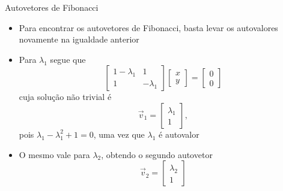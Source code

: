 \begin{frame}[fragile]{Autovetores de Fibonacci}

    \begin{itemize}
        \item Para encontrar os autovetores de Fibonacci, basta levar os autovalores novamente
            na igualdade anterior

        \item Para $\lambda_1$ segue que
        \[
             \begin{bmatrix} 1 - \lambda_1 & 1 \\ 1 & -\lambda_1 \end{bmatrix}
             \begin{bmatrix} x \\ y\end{bmatrix} = 
             \begin{bmatrix} 0 \\ 0\end{bmatrix}
        \]
        cuja solução não trivial é
        \[
             \vec{v}_1 = \begin{bmatrix} \lambda_1 \\ 1\end{bmatrix},
        \]
        pois $\lambda_1 - \lambda_1^2 + 1 = 0$, uma vez que $\lambda_1$ é autovalor   

        \item O mesmo vale para $\lambda_2$, obtendo o segundo autovetor
        \[
             \vec{v}_2 = \begin{bmatrix} \lambda_2 \\ 1\end{bmatrix}
        \]
    \end{itemize}

\end{frame}

